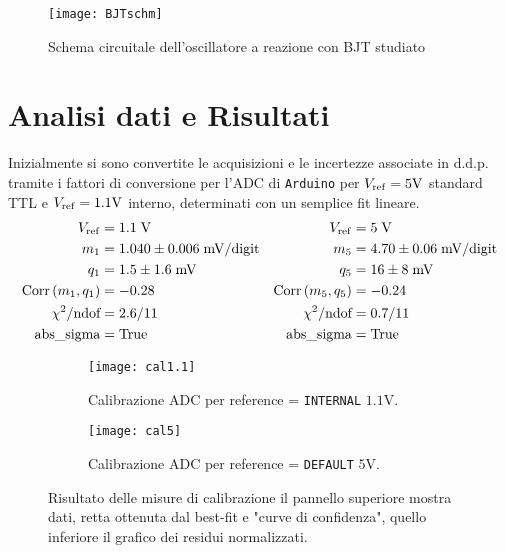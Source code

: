 \documentclass{article}[a4paper, oneside, 11pt]
\begin{document}
\begin{figure}[!htp]
	\centering 
		\texttt{[image: BJTschm]}
	\caption{Schema circuitale dell'oscillatore a reazione con BJT
	studiato\label{schm: BJT}}
\end{figure}

\section{Analisi dati e Risultati}
Inizialmente si sono convertite le acquisizioni e le incertezze associate in
d.d.p. tramite i fattori di conversione per l'ADC di \verb+Arduino+ per
$V_{\rm ref} = 5 \si{\V}$ standard TTL e $V_{\rm ref} = 1.1 \si{\V}$
interno, determinati con un semplice fit lineare.
\begin{align*}
	V_{\rm ref} &= 1.1\; \rm V	&V_{\rm ref} &= 5\; \rm V \\
	m_1 &= 1.040 \pm  0.006  \; \mathrm{mV/digit} 
	& m_5  &= 4.70 \pm 0.06  \; \mathrm{mV/digit} \\
	q_1 &= 1.5 \pm 1.6  \; \si{\mV} 	
	&q_5 &= 16  \pm 8  \; \si{\mV} \\
	\corr{m_1} {q_1} &= - 0.28      &\corr{m_5}{q_5} &= - 0.24 \\
	\chi^2/\text{ndof} &= 2.6/11	&\chi^2/\text{ndof} &= 0.7/11 \\ 
	\text{abs\_sigma} &= \rm True	&\text{abs\_sigma} &= \rm True
\end{align*}

\begin{figure}[!htb]
	\centering
	\begin{subfigure}{.5\textwidth}
		\texttt{[image: cal1.1]}
		\caption{Calibrazione ADC per reference = \texttt{INTERNAL} $1.1 \si{\V}$. 
	\label{fig: cal1.1}}
	\end{subfigure}%
	\begin{subfigure}{.5\textwidth}
		\texttt{[image: cal5]}
		\caption{Calibrazione ADC per reference = \texttt{DEFAULT} $5 \si{\V}$. 
	\label{fig: cal5}}
	\end{subfigure}
	\caption{Risultato delle misure di calibrazione il pannello superiore mostra
		dati, retta ottenuta dal best-fit e "curve di confidenza", quello inferiore
		il grafico dei residui normalizzati.\label{fig: cals}}
\end{figure}
\end{document}
